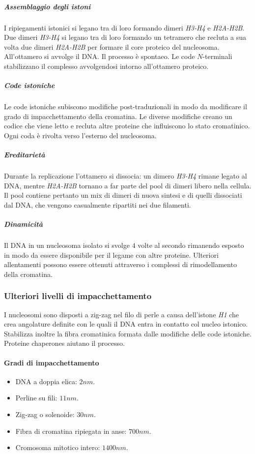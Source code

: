 				\subparagraph{Assemblaggio degli istoni}
				I ripiegamenti istonici si legano tra di loro formando dimeri \emph{H3-H4} e \emph{H2A-H2B}.
				Due dimeri \emph{H3-H4} si legano tra di loro formando un tetramero che recluta a sua volta due dimeri \emph{H2A-H2B} per formare il core proteico del nucleosoma.
				All'ottamero si avvolge il DNA.
				Il processo \`e spontaeo.
				Le code $N$-terminali stabilizzano il complesso avvolgendosi intorno all'ottamero proteico.

				\subparagraph{Code istoniche}
				Le code istoniche subiscono modifiche post-traduzionali in modo da modificare il grado di impacchettamento della cromatina.
				Le diverse modifiche creano un codice che viene letto e recluta altre proteine che influiscono lo stato cromatinico.
				Ogni coda \`e rivolta verso l'esterno del nucleosoma.

				\subparagraph{Ereditariet\`a}
				Durante la replicazione l'ottamero si dissocia: un dimero \emph{H3-H4} rimane legato al DNA, mentre \emph{H2A-H2B} tornano a far parte del pool di dimeri libero nella cellula.
				Il pool contiene pertanto un mix di dimeri di nuova sintesi e di quelli dissociati dal DNA, che vengono casualmente ripartiti nei due filamenti.

				\subparagraph{Dinamicit\`a}
				Il DNA in un nucleosoma isolato si svolge $4$ volte al secondo rimanendo esposto in modo da essere disponibile per il legame con altre proteine.
				Ulteriori allentamenti possono essere ottenuti attraverso i complessi di rimodellamento della cromatina.

		\subsubsection{Ulteriori livelli di impacchettamento}
		I nucleosomi sono disposti a zig-zag nel filo di perle a causa dell'istone \emph{H1} che crea angolature definite con le quali il DNA entra in contatto col nucleo istonico.
		Stabilizza inoltre la fibra cromatinica formata dalle modifiche delle code istoniche.
		Proteine chaperones aiutano il processo.
			
			\paragraph{Gradi di impacchettamento}
			\begin{multicols}{2}
				\begin{itemize}
					\item DNA a doppia elica: $2\si{nm}$.
					\item Perline su fili: $11\si{nm}$.
					\item Zig-zag o solenoide: $30\si{nm}$.
					\item Fibra di cromatina ripiegata in anse: $700\si{nm}$.
					\item Cromosoma mitotico intero: $1400\si{nm}$.
				\end{itemize}
			\end{multicols}
			
